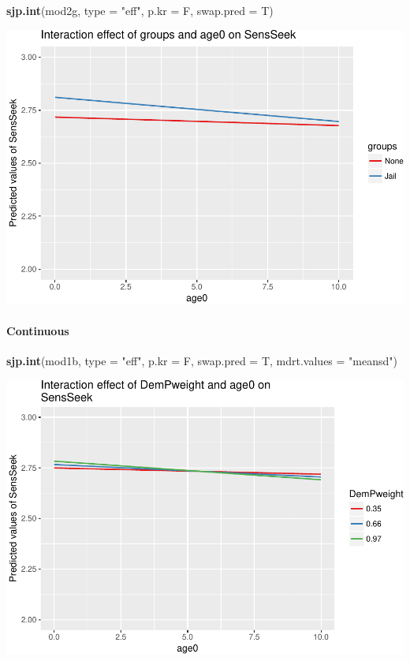 \documentclass[]{article}
\newenvironment{Shaded}{\begin{snugshade}}{\end{snugshade}}
\newcommand{\KeywordTok}[1]{\textcolor[rgb]{0.13,0.29,0.53}{\textbf{#1}}}
\newcommand{\DataTypeTok}[1]{\textcolor[rgb]{0.13,0.29,0.53}{#1}}
\newcommand{\StringTok}[1]{\textcolor[rgb]{0.31,0.60,0.02}{#1}}
\newcommand{\NormalTok}[1]{#1}
\let\oldparagraph\paragraph
\renewcommand{\paragraph}[1]{\oldparagraph{#1}\mbox{}}
\begin{document}
\begin{Shaded}
\begin{Highlighting}[]
\KeywordTok{sjp.int}\NormalTok{(mod2g, }\DataTypeTok{type =} \StringTok{"eff"}\NormalTok{, }\DataTypeTok{p.kr =}\NormalTok{ F, }\DataTypeTok{swap.pred =}\NormalTok{ T)}
\end{Highlighting}
\end{Shaded}

\includegraphics{Conditional_Models_doc_files/figure-latex/unnamed-chunk-29-1.pdf}

\paragraph{Continuous}\label{continuous}

\small

\begin{Shaded}
\begin{Highlighting}[]
\KeywordTok{sjp.int}\NormalTok{(mod1b, }\DataTypeTok{type =} \StringTok{"eff"}\NormalTok{, }\DataTypeTok{p.kr =}\NormalTok{ F, }\DataTypeTok{swap.pred =}\NormalTok{ T, }\DataTypeTok{mdrt.values =} \StringTok{"meansd"}\NormalTok{)}
\end{Highlighting}
\end{Shaded}

\includegraphics{Conditional_Models_doc_files/figure-latex/unnamed-chunk-30-1.pdf}
\end{document}
